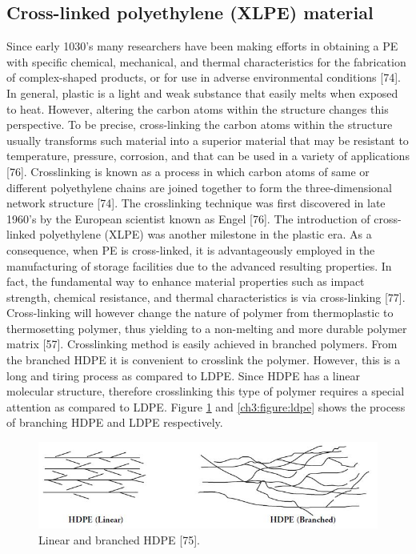 \documentclass[12pt]{report}
\begin{document}
\subsection{Cross-linked polyethylene (XLPE) material}

Since early 1030’s many researchers have been making efforts in obtaining a PE with specific chemical, mechanical, and thermal characteristics for the fabrication of complex-shaped products, or for use in adverse environmental conditions [74]. In general, plastic is a light and weak substance that easily melts when exposed to heat. However, altering the carbon atoms within the structure changes this perspective. To be precise, cross-linking the carbon atoms within the structure usually transforms such material into a superior material that may be resistant to temperature, pressure, corrosion, and that can be used in a variety of applications [76]. Crosslinking is known as a process in which carbon atoms of same or different polyethylene chains are joined together to form the three-dimensional network structure [74].
The crosslinking technique was first discovered in late 1960’s by the European scientist known as Engel [76]. The introduction of cross-linked polyethylene (XLPE) was another milestone in the plastic era. As a consequence, when PE is cross-linked, it is advantageously employed in the manufacturing of storage facilities due to the advanced resulting properties. In fact, the fundamental way to enhance material properties such as impact strength, chemical resistance, and thermal characteristics is via cross-linking [77]. Cross-linking will however change the nature of polymer from thermoplastic to thermosetting polymer, thus yielding to a non-melting and more durable polymer matrix [57]. Crosslinking method is easily achieved in branched polymers. From the branched HDPE it is convenient to crosslink the polymer. However, this is a long and tiring process as compared to LDPE.
Since HDPE has a linear molecular structure, therefore crosslinking this type of polymer requires a special attention as compared to LDPE. Figure \ref{ch3:figure:hdpe} and \ref{ch3:figure:ldpe} shows the process of branching HDPE and LDPE respectively.
 
\begin{figure}[H]
    \centering
    \includegraphics[width=\textwidth]{linear_and_branched_hdpe.jpg}
    \caption{Linear and branched HDPE [75].}
    \label{ch3:figure:hdpe}
\end{figure}
\end{document}
